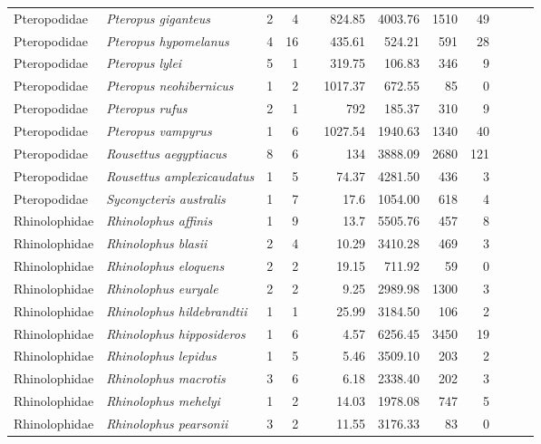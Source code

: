 \begin{landscape}
\begin{longtable}{@{}llrrrrrrrrrl@{}}
  Pteropodidae & \emph{Pteropus giganteus} & 2 & 4 &  & 824.85 & 4003.76 & 1510 & 49 &  &  &  \\ 
  Pteropodidae & \emph{Pteropus hypomelanus} & 4 & 16 &  & 435.61 & 524.21 & 591 & 28 &  &  &  \\ 
  Pteropodidae & \emph{Pteropus lylei} & 5 & 1 &  & 319.75 & 106.83 & 346 & 9 &  &  &  \\ 
  Pteropodidae & \emph{Pteropus neohibernicus} & 1 & 2 &  & 1017.37 & 672.55 & 85 & 0 &  &  &  \\ 
  Pteropodidae & \emph{Pteropus rufus} & 2 & 1 &  & 792 & 185.37 & 310 & 9 &  &  &  \\ 
  Pteropodidae & \emph{Pteropus vampyrus} & 1 & 6 &  & 1027.54 & 1940.63 & 1340 & 40 &  &  &  \\ 
  Pteropodidae & \emph{Rousettus aegyptiacus} & 8 & 6 &  & 134 & 3888.09 & 2680 & 121 &  &  &  \\ 
  Pteropodidae & \emph{Rousettus amplexicaudatus} & 1 & 5 &  & 74.37 & 4281.50 & 436 & 3 &  &  &  \\ 
  Pteropodidae & \emph{Syconycteris australis} & 1 & 7 &  & 17.6 & 1054.00 & 618 & 4 &  &  &  \\ 
  Rhinolophidae & \emph{Rhinolophus affinis} & 1 & 9 &  & 13.7 & 5505.76 & 457 & 8 &  &  &  \\ 
  Rhinolophidae & \emph{Rhinolophus blasii} & 2 & 4 &  & 10.29 & 3410.28 & 469 & 3 &  &  &  \\ 
  Rhinolophidae & \emph{Rhinolophus eloquens} & 2 & 2 &  & 19.15 & 711.92 & 59 & 0 &  &  &  \\ 
  Rhinolophidae & \emph{Rhinolophus euryale} & 2 & 2 &  & 9.25 & 2989.98 & 1300 & 3 &  &  &  \\ 
  Rhinolophidae & \emph{Rhinolophus hildebrandtii} & 1 & 1 &  & 25.99 & 3184.50 & 106 & 2 &  &  &  \\ 
  Rhinolophidae & \emph{Rhinolophus hipposideros} & 1 & 6 &  & 4.57 & 6256.45 & 3450 & 19 &  &  &  \\ 
  Rhinolophidae & \emph{Rhinolophus lepidus} & 1 & 5 &  & 5.46 & 3509.10 & 203 & 2 &  &  &  \\ 
  Rhinolophidae & \emph{Rhinolophus macrotis} & 3 & 6 &  & 6.18 & 2338.40 & 202 & 3 &  &  &  \\ 
  Rhinolophidae & \emph{Rhinolophus mehelyi} & 1 & 2 &  & 14.03 & 1978.08 & 747 & 5 &  &  &  \\ 
  Rhinolophidae & \emph{Rhinolophus pearsonii} & 3 & 2 &  & 11.55 & 3176.33 & 83 & 0 &  &  &  \\ 

\end{longtable}
\end{landscape}
